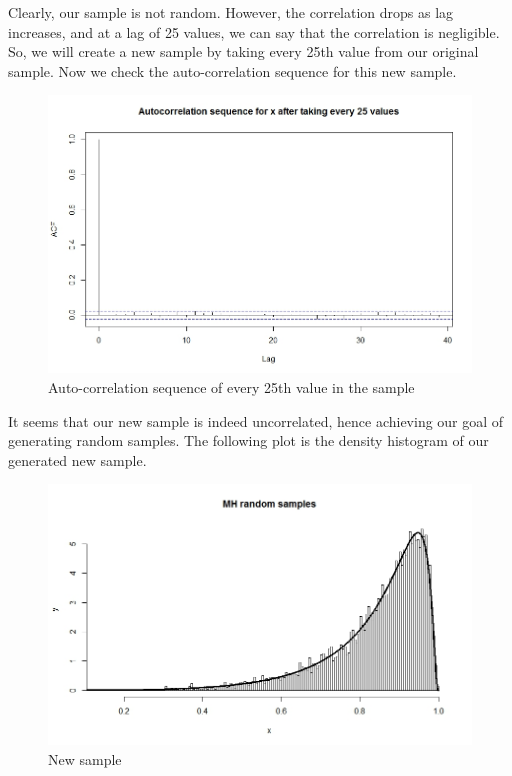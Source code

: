 \documentclass[11pt, a4paper]{article}
\begin{document}
Clearly, our sample is not random. However, the correlation drops as lag increases, and at a lag of 25 values, we can say that the correlation is negligible. So, we will create a new sample by taking every 25th value from our original sample. Now we check the auto-correlation sequence for this new sample.

\begin{figure}[H]
\centering
	\includegraphics[scale=0.4]{3acf2.jpeg}
\caption{Auto-correlation sequence of every 25th value in the sample}
\end{figure}

It seems that our new sample is indeed uncorrelated, hence achieving our goal of generating random samples. The following plot is the density histogram of our generated new sample.

\begin{figure}[H]
\centering
	\includegraphics[scale=0.4]{3mh.jpeg}
\caption{New sample}
\end{figure}
\end{document}
